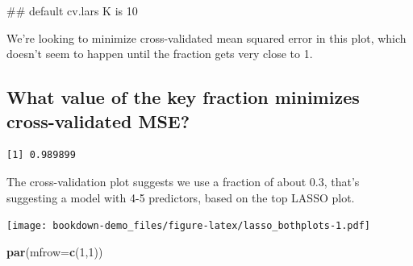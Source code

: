 \documentclass[]{book}
\newenvironment{Shaded}{\begin{snugshade}}{\end{snugshade}}
\newcommand{\KeywordTok}[1]{\textcolor[rgb]{0.13,0.29,0.53}{\textbf{#1}}}
\newcommand{\DataTypeTok}[1]{\textcolor[rgb]{0.13,0.29,0.53}{#1}}
\newcommand{\DecValTok}[1]{\textcolor[rgb]{0.00,0.00,0.81}{#1}}
\newcommand{\StringTok}[1]{\textcolor[rgb]{0.31,0.60,0.02}{#1}}
\newcommand{\OperatorTok}[1]{\textcolor[rgb]{0.81,0.36,0.00}{\textbf{#1}}}
\newcommand{\NormalTok}[1]{#1}
\theoremstyle{definition}
\theoremstyle{definition}
\theoremstyle{definition}
\theoremstyle{remark}
\begin{document}
\begin{Shaded}
\begin{Highlighting}[]
\NormalTok{## default cv.lars K is 10}
\end{Highlighting}
\end{Shaded}

We're looking to minimize cross-validated mean squared error in this
plot, which doesn't seem to happen until the fraction gets very close to
1.

\subsection{What value of the key fraction minimizes cross-validated
MSE?}\label{what-value-of-the-key-fraction-minimizes-cross-validated-mse}

\begin{Shaded}
\end{Shaded}

\begin{verbatim}
[1] 0.989899
\end{verbatim}

The cross-validation plot suggests we use a fraction of about 0.3,
that's suggesting a model with 4-5 predictors, based on the top LASSO
plot.

\begin{Shaded}
\end{Shaded}

\texttt{[image: bookdown-demo\_files/figure-latex/lasso\_bothplots-1.pdf]}

\begin{Shaded}
\begin{Highlighting}[]
\KeywordTok{par}\NormalTok{(}\DataTypeTok{mfrow=}\KeywordTok{c}\NormalTok{(}\DecValTok{1}\NormalTok{,}\DecValTok{1}\NormalTok{))}
\end{Highlighting}
\end{Shaded}
\end{document}
